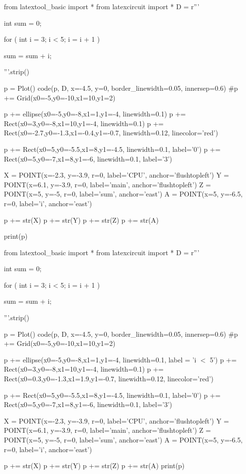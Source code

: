 \begin{python}
from latextool_basic import *
from latexcircuit import *
D = r'''



int sum = 0;

    for ( int i = 3;     i < 5;     i = i + 1 )


        sum = sum + i;



'''.strip()

p = Plot()
code(p, D, x=-4.5, y=0, border_linewidth=0.05, innersep=0.6)
#p += Grid(x0=-5,y0=-10,x1=10,y1=2)

p += ellipse(x0=-5,y0=-8,x1=1,y1=-4, linewidth=0.1)
p += Rect(x0=3,y0=-8,x1=10,y1=-4, linewidth=0.1)
p += Rect(x0=-2.7,y0=-1.3,x1=-0.4,y1=-0.7, linewidth=0.12, linecolor='red')

p += Rect(x0=5,y0=-5.5,x1=8,y1=-4.5, linewidth=0.1, label='0')
p += Rect(x0=5,y0=-7,x1=8,y1=-6, linewidth=0.1, label='3')

X = POINT(x=-2.3, y=-3.9, r=0, label='CPU', anchor='flushtopleft')
Y = POINT(x=6.1, y=-3.9, r=0, label='main', anchor='flushtopleft')
Z = POINT(x=5, y=-5, r=0, label='sum', anchor='east')
A = POINT(x=5, y=-6.5, r=0, label='i', anchor='east')

p += str(X)
p += str(Y)
p += str(Z)
p += str(A)

print(p)
\end{python}

\begin{python}
from latextool_basic import *
from latexcircuit import *
D = r'''



int sum = 0;

    for ( int i = 3;     i < 5;     i = i + 1 )


        sum = sum + i;



'''.strip()

p = Plot()
code(p, D, x=-4.5, y=0, border_linewidth=0.05, innersep=0.6)
#p += Grid(x0=-5,y0=-10,x1=10,y1=2)

p += ellipse(x0=-5,y0=-8,x1=1,y1=-4, linewidth=0.1, label = 'i $<$ 5')
p += Rect(x0=3,y0=-8,x1=10,y1=-4, linewidth=0.1)
p += Rect(x0=0.3,y0=-1.3,x1=1.9,y1=-0.7, linewidth=0.12, linecolor='red')

p += Rect(x0=5,y0=-5.5,x1=8,y1=-4.5, linewidth=0.1, label='0')
p += Rect(x0=5,y0=-7,x1=8,y1=-6, linewidth=0.1, label='3')

X = POINT(x=-2.3, y=-3.9, r=0, label='CPU', anchor='flushtopleft')
Y = POINT(x=6.1, y=-3.9, r=0, label='main', anchor='flushtopleft')
Z = POINT(x=5, y=-5, r=0, label='sum', anchor='east')
A = POINT(x=5, y=-6.5, r=0, label='i', anchor='east')

p += str(X)
p += str(Y)
p += str(Z)
p += str(A)
print(p)
\end{python}

